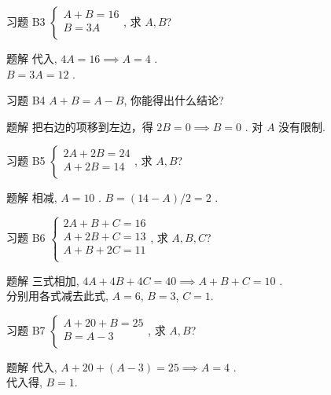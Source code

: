\documentclass[content.tex]{subfiles}
\begin{document}
\begin{frame}{习题 B3}
$
\begin{cases}
A + B = 16\\
B = 3A\\
\end{cases}
$, 求 $A, B$? 
\begin{exampleblock}{题解}
代入, $4A = 16\implies A=4$ . \\
$B = 3A = 12$ .
\end{exampleblock}
\end{frame}

\begin{frame}{习题 B4}
$A + B = A - B$, 你能得出什么结论?
\begin{exampleblock}{题解}
把右边的项移到左边，得 $2B=0\implies B = 0$ .
对 $A$ 没有限制.
\end{exampleblock}
\end{frame}

\begin{frame}{习题 B5}
$
\begin{cases}
2A + 2B = 24\\
A + 2B = 14\\
\end{cases}
$, 求 $A, B$? 
\begin{exampleblock}{题解}
相减, $A = 10$ . $B = (14-A)/2 = 2$ .
\end{exampleblock}
\end{frame}

\begin{frame}{习题 B6}
$
\begin{cases}
2A + B + C = 16\\
A + 2B + C = 13\\
A + B + 2C = 11\\
\end{cases}
$, 求 $A, B, C$? 
\begin{exampleblock}{题解}
三式相加, $4A + 4B + 4C = 40\implies A + B + C = 10$ . \\
分别用各式减去此式, $A = 6$, $B = 3$, $C = 1$.
\end{exampleblock}
\end{frame}

\begin{frame}{习题 B7}
$
\begin{cases}
A + 20 + B = 25\\
B = A - 3\\
\end{cases}
$, 求 $A, B$? 
\begin{exampleblock}{题解}
代入, $A + 20 + (A - 3) = 25\implies A = 4$ . \\
代入得, $B = 1$.
\end{exampleblock}
\end{frame}
\end{document}

